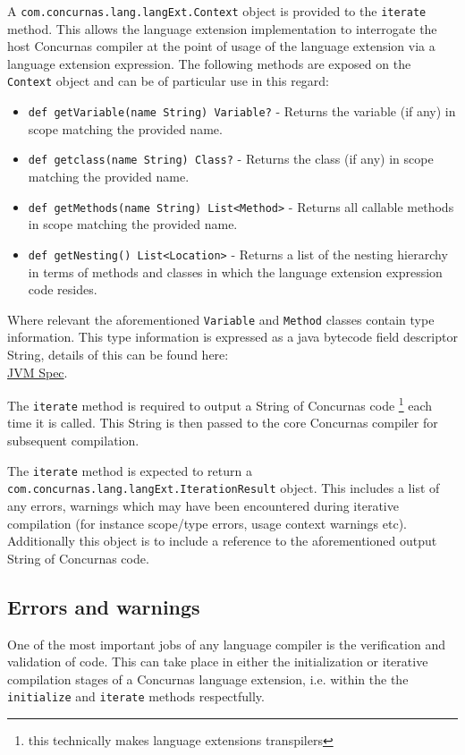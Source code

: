 \documentclass[conc-doc]{subfiles}
\begin{document}
A \lstinline{com.concurnas.lang.langExt.Context} object is provided to the \lstinline{iterate} method. This allows the language extension implementation to interrogate the host Concurnas compiler at the point of usage of the language extension via a language extension expression. The following methods are exposed on the \lstinline{Context} object and can be of particular use in this regard:

\begin{itemize}
	\item \lstinline{def getVariable(name String) Variable?} - Returns the variable (if any) in scope matching the provided name.
	\item \lstinline{def getclass(name String) Class?} - Returns the class (if any) in scope matching the provided name.
	\item \lstinline{def getMethods(name String) List<Method>} - Returns all callable methods in scope matching the provided name.
	\item \lstinline{def getNesting() List<Location>} - Returns a list of the nesting hierarchy in terms of methods and classes in which the language extension expression code resides.
\end{itemize}

Where relevant the aforementioned \lstinline{Variable} and \lstinline{Method} classes contain type information. This type information is expressed as a java bytecode field descriptor String, details of this can be found here:\\ \href{https://docs.oracle.com/javase/specs/jvms/se7/html/jvms-4.html#jvms-4.3.2}{JVM Spec}.

The \lstinline{iterate} method is required to output a String of Concurnas code \footnote{this technically makes language extensions transpilers} each time it is called. This String is then passed to the core Concurnas compiler for subsequent compilation.

The \lstinline{iterate} method is expected to return a \lstinline{com.concurnas.lang.langExt.IterationResult} object. This includes a list of any errors, warnings which may have been encountered during iterative compilation (for instance scope/type errors, usage context warnings etc). Additionally this object is to include a reference to the aforementioned output String of Concurnas code.


\subsection{Errors and warnings}
One of the most important jobs of any language compiler is the verification and validation of code. This can take place in either the initialization or iterative compilation stages of a Concurnas language extension, i.e. within the the \lstinline{initialize} and \lstinline{iterate} methods respectfully.
\end{document}
